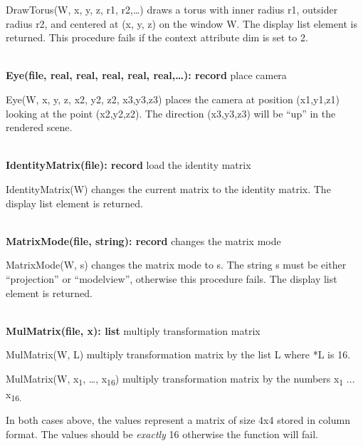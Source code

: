 \documentclass[letterpaper]{article}
\begin{document}
\bigskip

\textsf{DrawTorus(W, x, y, z, r1, r2,{\dots})} draws a torus with
inner radius r1, outsider radius r2, and centered at (x, y, z) on the
window W. The display list element is returned. This procedure fails
if the context attribute dim is set to 2.

\noindent\hrulefill\\
\noindent\textsf{\textbf{Eye(file, real, real, real, real, real,{\dots}): record}} \hfill place camera


\bigskip

\textsf{Eye(W, x, y, z, x2, y2, z2, x3,y3,z3)} places the camera at
position (x1,y1,z1) looking at the point (x2,y2,z2). The direction
(x3,y3,z3) will be ``up'' in the rendered scene.

\noindent\hrulefill\\
\noindent\textsf{\textbf{IdentityMatrix(file): record}}
\hfill load the identity matrix


\bigskip

\textsf{IdentityMatrix(W)} changes the current matrix to the identity
matrix. The display list element is returned.


\bigskip

\noindent\hrulefill\\
\noindent\textsf{\textbf{MatrixMode(file, string): record}}
\hfill changes the matrix mode


\bigskip

\textsf{MatrixMode(W, s)} changes the matrix mode to s. The string s
must be either \textsf{{}``projection''} or \textsf{{}``modelview''},
otherwise this procedure fails. The display list element is returned.


\bigskip

\noindent\hrulefill\\
\noindent\textsf{\textbf{MulMatrix(file, x): list}}
\hfill multiply transformation matrix


\bigskip

\textsf{MulMatrix(W, L)} multiply transformation matrix by the list L
where *L is 16.

{
\textsf{MulMatrix(W, x}\textsf{\textsubscript{1}}\textsf{, {\dots}, x}\textsf{\textsubscript{16}}\textsf{) }multiply
transformation matrix by the numbers x\textsubscript{1} ... x\textsubscript{16.}}

In both cases above, the values represent a matrix of size 4x4 stored
in column format. The values should be {\em exactly\/} 16
otherwise the function will fail.
\end{document}
